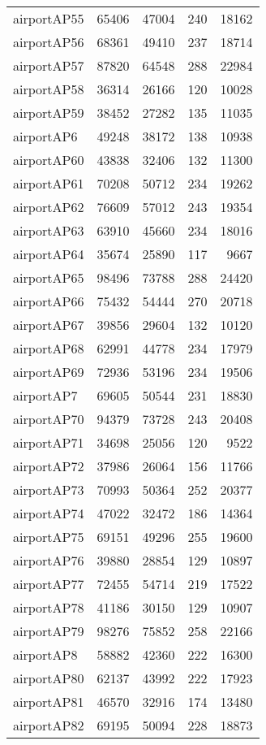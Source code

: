 \begin{tabular}{lrrrr}
airportAP55 & 65406 & 47004 & 240 & 18162 \\
airportAP56 & 68361 & 49410 & 237 & 18714 \\
airportAP57 & 87820 & 64548 & 288 & 22984 \\
airportAP58 & 36314 & 26166 & 120 & 10028 \\
airportAP59 & 38452 & 27282 & 135 & 11035 \\
airportAP6 & 49248 & 38172 & 138 & 10938 \\
airportAP60 & 43838 & 32406 & 132 & 11300 \\
airportAP61 & 70208 & 50712 & 234 & 19262 \\
airportAP62 & 76609 & 57012 & 243 & 19354 \\
airportAP63 & 63910 & 45660 & 234 & 18016 \\
airportAP64 & 35674 & 25890 & 117 & 9667 \\
airportAP65 & 98496 & 73788 & 288 & 24420 \\
airportAP66 & 75432 & 54444 & 270 & 20718 \\
airportAP67 & 39856 & 29604 & 132 & 10120 \\
airportAP68 & 62991 & 44778 & 234 & 17979 \\
airportAP69 & 72936 & 53196 & 234 & 19506 \\
airportAP7 & 69605 & 50544 & 231 & 18830 \\
airportAP70 & 94379 & 73728 & 243 & 20408 \\
airportAP71 & 34698 & 25056 & 120 & 9522 \\
airportAP72 & 37986 & 26064 & 156 & 11766 \\
airportAP73 & 70993 & 50364 & 252 & 20377 \\
airportAP74 & 47022 & 32472 & 186 & 14364 \\
airportAP75 & 69151 & 49296 & 255 & 19600 \\
airportAP76 & 39880 & 28854 & 129 & 10897 \\
airportAP77 & 72455 & 54714 & 219 & 17522 \\
airportAP78 & 41186 & 30150 & 129 & 10907 \\
airportAP79 & 98276 & 75852 & 258 & 22166 \\
airportAP8 & 58882 & 42360 & 222 & 16300 \\
airportAP80 & 62137 & 43992 & 222 & 17923 \\
airportAP81 & 46570 & 32916 & 174 & 13480 \\
airportAP82 & 69195 & 50094 & 228 & 18873 \\

\end{tabular}
